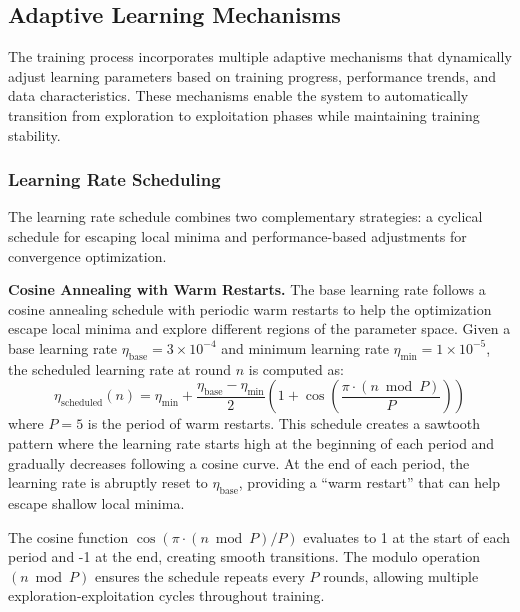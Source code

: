 \documentclass[conference]{IEEEtran}
\begin{document}
\subsection{Adaptive Learning Mechanisms}

The training process incorporates multiple adaptive mechanisms that dynamically adjust learning parameters based on training progress, performance trends, and data characteristics. These mechanisms enable the system to automatically transition from exploration to exploitation phases while maintaining training stability.

\subsubsection{Learning Rate Scheduling}

The learning rate schedule combines two complementary strategies: a cyclical schedule for escaping local minima and performance-based adjustments for convergence optimization.

\textbf{Cosine Annealing with Warm Restarts.} The base learning rate follows a cosine annealing schedule with periodic warm restarts to help the optimization escape local minima and explore different regions of the parameter space. Given a base learning rate $\eta_{\text{base}} = 3 \times 10^{-4}$ and minimum learning rate $\eta_{\text{min}} = 1 \times 10^{-5}$, the scheduled learning rate at round $n$ is computed as:
%
\begin{equation}
\eta_{\text{scheduled}}(n) = \eta_{\text{min}} + \frac{\eta_{\text{base}} - \eta_{\text{min}}}{2}\left(1 + \cos\left(\frac{\pi \cdot (n \bmod P)}{P}\right)\right)
\end{equation}
%
where $P = 5$ is the period of warm restarts. This schedule creates a sawtooth pattern where the learning rate starts high at the beginning of each period and gradually decreases following a cosine curve. At the end of each period, the learning rate is abruptly reset to $\eta_{\text{base}}$, providing a ``warm restart'' that can help escape shallow local minima.

The cosine function $\cos(\pi \cdot (n \bmod P) / P)$ evaluates to 1 at the start of each period and -1 at the end, creating smooth transitions. The modulo operation $(n \bmod P)$ ensures the schedule repeats every $P$ rounds, allowing multiple exploration-exploitation cycles throughout training.
\end{document}
